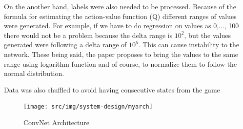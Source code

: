 On the another hand, labels were also needed to be processed. Because of the formula for estimating the action-value function (Q) different ranges of values were generated. For example, if we have to do regression on values as 0,..., 100 there would not be a problem because the delta range is $10^2$, but the values generated were following a delta range of $10^5$. This can cause instability to the network. These being said, the paper proposes to bring the values to the same range using logarithm function and of course, to normalize them to follow the normal distribution.

Data was also shuffled to avoid having consecutive states from the game

\begin{figure}[h]
	\begin{center}
		\texttt{[image: src/img/system-design/myarch]}
		\caption{ConvNet Architecture} \label{fig:myarch}
    \end{center}
\end{figure}